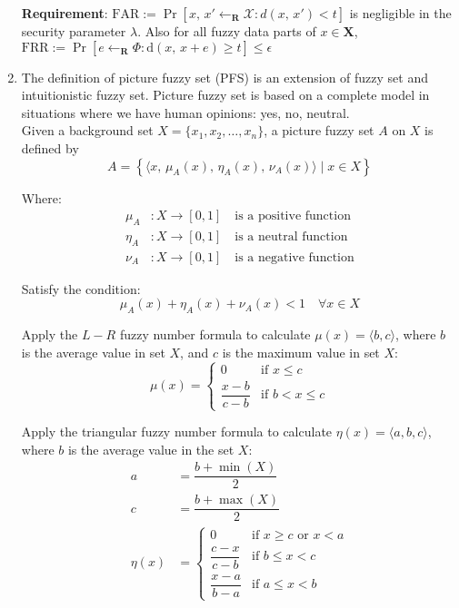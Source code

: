 \documentclass[graybox]{svmult}
\begin{document}
\begin{enumerate}[label=(\roman*), itemsep=1em]
          \textbf{Requirement}: \( \text{FAR} := \Pr[x,\, x' \leftarrow_{\mathbf{R}} {\mathcal{X}} : d(x,\, x') < t] \) is negligible in the security parameter  \( \lambda \). Also for all fuzzy data parts of \( x \in \mathbf{X} \), \( \text{FRR} := \Pr[e \leftarrow_{\mathbf{R}} \varPhi : \mathrm{d}(x, \, x + e) \geq t] \leq \epsilon \)
    \item The definition of picture fuzzy set (PFS) is an extension of fuzzy set and intuitionistic fuzzy set. Picture fuzzy set is based on a complete model in situations where we have human opinions: yes, no, neutral. \\[6pt]
          Given a background set \( X = \{x_1, x_2, \dots, x_n \} \), a picture fuzzy set \( A \) on \( X \) is defined by
          \[
              A = \left\{ \langle x,\, \mu_A(x),\, \eta_A(x),\, \nu_A(x) \rangle \mid x \in X \right\}
          \]

          Where:
          \begin{align*}
              \mu_A  & : X \to [0, 1] \quad \text{is a positive function} \\[6pt]
              \eta_A & : X \to [0, 1] \quad \text{is a neutral function}  \\[6pt]
              \nu_A  & : X \to [0, 1] \quad \text{is a negative function}
          \end{align*}

          Satisfy the condition:
          \[
              \mu_A(x) + \eta_A(x) + \nu_A(x) < 1 \quad \forall x \in X
          \]

          Apply the \( L- R \) fuzzy number formula to calculate \( \mu(x) = \langle b, c \rangle \), where \( b \) is the average value in set \( X \), and \( c \) is the maximum value in set \( X \):
          \[
              \mu(x) = \begin{cases}
                  0                & \text{if } x \leq c     \\
                  \dfrac{x-b}{c-b} & \text{if } b < x \leq c
              \end{cases}
          \]

          Apply the triangular fuzzy number formula to calculate \( \eta(x) = \langle a, b, c \rangle \), where \( b \) is the average value in the set \( X \):
          \begin{align*}
              a       & = \dfrac{b + \min(X)}{2}                                          \\[6pt]
              c       & = \dfrac{b + \max(X)}{2}                                          \\[6pt]
              \eta(x) & = \begin{cases}
                              0                & \text{if } x \geq c \text{ or } x < a \\
                              \dfrac{c-x}{c-b} & \text{if } b \leq x < c               \\[6pt]
                              \dfrac{x-a}{b-a} & \text{if } a \leq x < b
                          \end{cases}
          \end{align*}



\end{enumerate}
\end{document}
